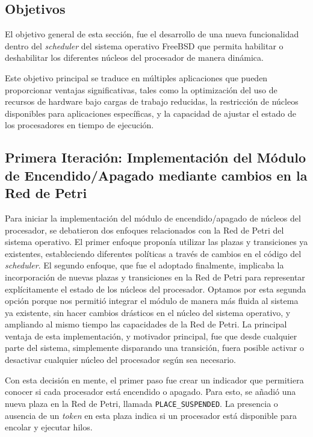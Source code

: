 \subsection{Objetivos}

El objetivo general de esta sección, fue el desarrollo de una nueva funcionalidad dentro del \textit{scheduler} del sistema operativo FreeBSD que permita habilitar o deshabilitar los diferentes núcleos del procesador de manera dinámica.\par

Este objetivo principal se traduce en múltiples aplicaciones que pueden proporcionar ventajas significativas, tales como la optimización del uso de recursos de hardware bajo cargas de trabajo reducidas, la restricción de núcleos disponibles para aplicaciones específicas, y la capacidad de ajustar el estado de los procesadores en tiempo de ejecución.\par

\subsection{Primera Iteración: Implementación del Módulo de Encendido/Apagado mediante cambios en la Red de Petri}

Para iniciar la implementación del módulo de encendido/apagado de núcleos del procesador, se debatieron dos enfoques relacionados con la Red de Petri del sistema operativo. El primer enfoque proponía utilizar las plazas y transiciones ya existentes, estableciendo diferentes políticas a través de cambios en el código del \textit{scheduler}. El segundo enfoque, que fue el adoptado finalmente, implicaba la incorporación de nuevas plazas y transiciones en la Red de Petri para representar explícitamente el estado de los núcleos del procesador. Optamos por esta segunda opción porque nos permitió integrar el módulo de manera más fluida al sistema ya existente, sin hacer cambios drásticos en el núcleo del sistema operativo, y ampliando al mismo tiempo las capacidades de la Red de Petri. La principal ventaja de esta implementación, y motivador principal, fue que desde cualquier parte del sistema, simplemente disparando una transición, fuera posible activar o desactivar cualquier núcleo del procesador según sea necesario.\par

Con esta decisión en mente, el primer paso fue crear un indicador que permitiera conocer si cada procesador está encendido o apagado. Para esto, se añadió una nueva plaza en la Red de Petri, llamada \verb|PLACE_SUSPENDED|. La presencia o ausencia de un \textit{token} en esta plaza indica si un procesador está disponible para encolar y ejecutar hilos.\par

